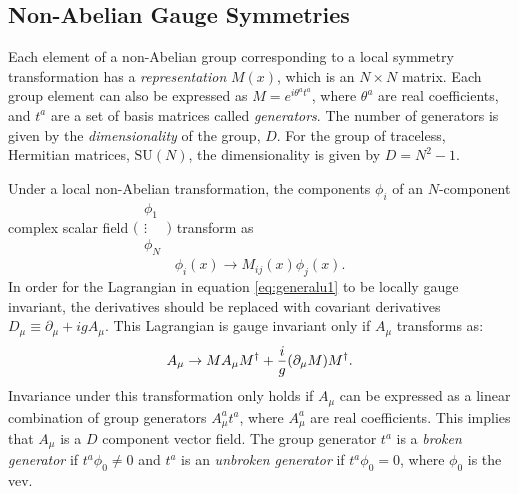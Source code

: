%
%
%
\subsection{Non-Abelian Gauge Symmetries}

Each element of a non-Abelian group corresponding to a local symmetry transformation has a \textit{representation} $M(x)$, which is an $N\times N$ matrix. Each group element can also be expressed as $M=e^{i\theta^at^a}$, where $\theta^a$ are real coefficients, and $t^a$ are a set of basis matrices called \textit{generators}. The number of generators is given by the \textit{dimensionality} of the group, $D$. For the group of traceless, Hermitian matrices, $\mathrm{SU}(N)$, the dimensionality is given by $D=N^2-1$. 

Under a local non-Abelian transformation, the components $\phi_i$ of an $N$-component complex scalar field 
$\Bigg(\begin{smallmatrix}
    \phi_1\\
    \vdots\\
    \phi_N
\end{smallmatrix}\Bigg)$ transform as
\begin{equation}
    \phi_i(x)\rightarrow M_{ij}(x)\phi_j(x).
\end{equation}
In order for the Lagrangian in equation \ref{eq:generalu1} to be locally gauge invariant, the derivatives should be replaced with covariant derivatives $D_\mu\equiv\partial_\mu+igA_\mu$. This Lagrangian is gauge invariant only if $A_\mu$ transforms as:
\begin{equation}\label{eq:nonabela}
    A_\mu\rightarrow MA_\mu M^\dagger + \frac{i}{g}(\partial_\mu M)M^\dagger.
\end{equation}
Invariance under this transformation only holds if $A_\mu$ can be expressed as a linear combination of group generators $A^a_\mu t^a$, where $A^a_\mu$ are real coefficients. This implies that $A_\mu$ is a $D$ component vector field. The group generator $t^a$ is a \textit{broken generator} if $t^a\phi_0\neq0$ and $t^a$ is an \textit{unbroken generator} if $t^a\phi_0=0$, where $\phi_0$ is the vev. 

